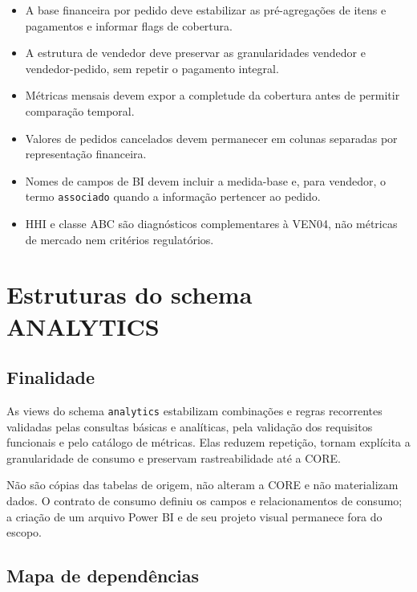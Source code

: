 \documentclass[12pt,a4paper]{article}
\providecommand{\tightlist}{
  \setlength{\itemsep}{0pt}\setlength{\parskip}{0pt}
}
\begin{document}
\begin{itemize}
\tightlist
\item
  A base financeira por pedido deve estabilizar as pré-agregações de
  itens e pagamentos e informar flags de cobertura.
\item
  A estrutura de vendedor deve preservar as granularidades vendedor e
  vendedor-pedido, sem repetir o pagamento integral.
\item
  Métricas mensais devem expor a completude da cobertura antes de
  permitir comparação temporal.
\item
  Valores de pedidos cancelados devem permanecer em colunas separadas
  por representação financeira.
\item
  Nomes de campos de BI devem incluir a medida-base e, para vendedor, o
  termo \nolinkurl{associado} quando a informação pertencer ao pedido.
\item
  HHI e classe ABC são diagnósticos complementares à VEN04, não métricas
  de mercado nem critérios regulatórios.
\end{itemize}

\section{Estruturas do schema
ANALYTICS}\label{docs__analytics__estruturas_schema_analytics.md__estruturas-do-schema-analytics}

\subsection{Finalidade}\label{docs__analytics__estruturas_schema_analytics.md__finalidade}

As views do schema \nolinkurl{analytics} estabilizam combinações e
regras recorrentes validadas pelas consultas básicas e analíticas, pela
validação dos requisitos funcionais e pelo catálogo de métricas. Elas reduzem
repetição, tornam explícita a granularidade de consumo e preservam
rastreabilidade até a CORE.

Não são cópias das tabelas de origem, não alteram a CORE e não
materializam dados. O contrato de consumo definiu os campos e relacionamentos de
consumo; a criação de um arquivo Power BI e de seu projeto visual
permanece fora do escopo.

\subsection{Mapa de
dependências}\label{docs__analytics__estruturas_schema_analytics.md__mapa-de-dependuxeancias}
\end{document}
